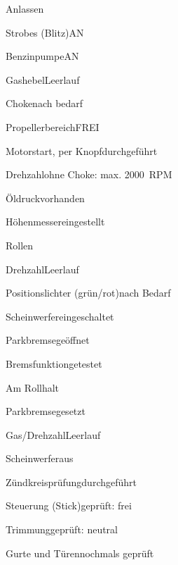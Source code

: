 \begin{checklist}{Anlassen}
	\item{Strobes (Blitz)}{AN}
	\item{Benzinpumpe}{AN}
	\item{Gashebel}{Leerlauf}
	\item{Choke}{nach bedarf}
	\item{Propellerbereich}{FREI}
	\item{Motorstart, per Knopf}{durchgeführt}
	\item{Drehzahl}{ohne Choke: max. 2000~RPM}
	\item{Öldruck}{vorhanden}
	  \item{Höhenmesser}{eingestellt}
\end{checklist}

\begin{checklist}{Rollen}
	\item{Drehzahl}{Leerlauf}
	\item{Positionslichter (grün/rot)}{nach Bedarf}
	\item{Scheinwerfer}{eingeschaltet}
	\item{Parkbremse}{geöffnet}
	  \item{Bremsfunktion}{getestet}
\end{checklist}

\begin{checklist}{Am Rollhalt}
	\item{Parkbremse}{gesetzt}
	\item{Gas/Drehzahl}{Leerlauf}
	\item{Scheinwerfer}{aus}
	\item{Zündkreisprüfung}{durchgeführt}
	\item{Steuerung (Stick)}{geprüft: frei}
	\item{Trimmung}{geprüft: neutral}
	\item{Gurte und Türen}{nochmals geprüft}
\end{checklist}

